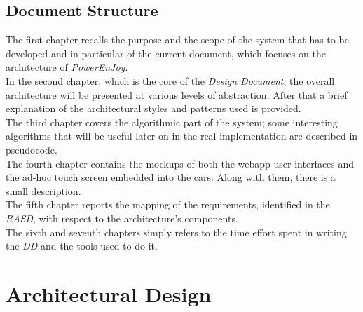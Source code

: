 \documentclass[11pt,a4paper]{report}
\begin{document}
\section{Document Structure}
The first chapter recalls the purpose and the scope of the system that has to be developed and in particular of the current document, which focuses on the architecture of \textit{PowerEnJoy}.\\
In the second chapter, which is the core of the \textit{Design Document},
the overall architecture will be presented at various levels of abstraction. After that a brief explanation of the architectural styles and patterns used is provided.\\
The third chapter covers the algorithmic part of the system; some interesting algorithms that will be useful later on in the real implementation are described in pseudocode.\\
The fourth chapter contains the mockups of both the webapp user interfaces and the ad-hoc touch screen embedded into the cars. Along with them, there is a small description.\\
The fifth chapter reports the mapping of the requirements, identified in the \textit{RASD}, with respect to the architecture's components.\\
The sixth and seventh chapters simply refers to the time effort spent in writing the \textit{DD} and the tools used to do it.
\chapter{Architectural Design}
\end{document}
